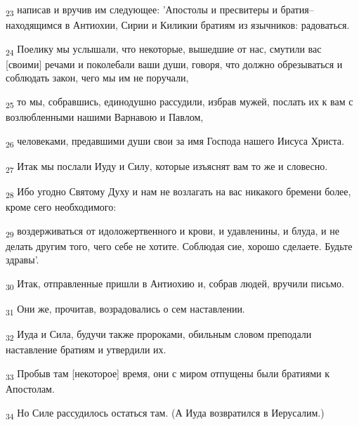 \begin{tcolorbox}
\textsubscript{23} написав и вручив им следующее: 'Апостолы и пресвитеры и братия--находящимся в Антиохии, Сирии и Киликии братиям из язычников: радоваться.
\end{tcolorbox}
\begin{tcolorbox}
\textsubscript{24} Поелику мы услышали, что некоторые, вышедшие от нас, смутили вас [своими] речами и поколебали ваши души, говоря, что должно обрезываться и соблюдать закон, чего мы им не поручали,
\end{tcolorbox}
\begin{tcolorbox}
\textsubscript{25} то мы, собравшись, единодушно рассудили, избрав мужей, послать их к вам с возлюбленными нашими Варнавою и Павлом,
\end{tcolorbox}
\begin{tcolorbox}
\textsubscript{26} человеками, предавшими души свои за имя Господа нашего Иисуса Христа.
\end{tcolorbox}
\begin{tcolorbox}
\textsubscript{27} Итак мы послали Иуду и Силу, которые изъяснят вам то же и словесно.
\end{tcolorbox}
\begin{tcolorbox}
\textsubscript{28} Ибо угодно Святому Духу и нам не возлагать на вас никакого бремени более, кроме сего необходимого:
\end{tcolorbox}
\begin{tcolorbox}
\textsubscript{29} воздерживаться от идоложертвенного и крови, и удавленины, и блуда, и не делать другим того, чего себе не хотите. Соблюдая сие, хорошо сделаете. Будьте здравы'.
\end{tcolorbox}
\begin{tcolorbox}
\textsubscript{30} Итак, отправленные пришли в Антиохию и, собрав людей, вручили письмо.
\end{tcolorbox}
\begin{tcolorbox}
\textsubscript{31} Они же, прочитав, возрадовались о сем наставлении.
\end{tcolorbox}
\begin{tcolorbox}
\textsubscript{32} Иуда и Сила, будучи также пророками, обильным словом преподали наставление братиям и утвердили их.
\end{tcolorbox}
\begin{tcolorbox}
\textsubscript{33} Пробыв там [некоторое] время, они с миром отпущены были братиями к Апостолам.
\end{tcolorbox}
\begin{tcolorbox}
\textsubscript{34} Но Силе рассудилось остаться там. (А Иуда возвратился в Иерусалим.)
\end{tcolorbox}

